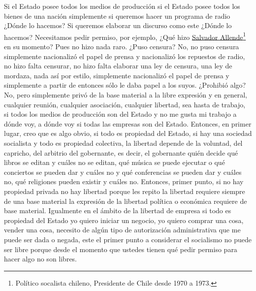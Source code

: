 Si el Estado posee todos los medios de producción si el Estado posee todos los bienes de una nación simplemente si queremos hacer un programa de radio ¿Dónde lo hacemos? Si queremos elaborar un discurso como este ¿Dónde lo hacemos? Necesitamos pedir permiso, por ejemplo, ¿Qué hizo \href{https://en.wikipedia.org/wiki/Salvador_Allende}{Salvador Allende}\footnote{Político socalista chileno, Presidente de Chile desde 1970 a 1973.} en su momento? Pues no hizo nada raro. ¿Puso censura? No, no puso censura simplemente nacionalizó el papel de prensa y nacionalizó los repuestos de radio, no hizo falta censurar, no hizo falta elaborar una ley de censura, una ley de mordaza, nada así por estilo, simplemente nacionalizó el papel de prensa y simplemente a partir de entonces sólo le daba papel a los suyos. ¿Prohibió algo? No, pero simplemente privó de la base material a la libre expresión y en general, cualquier reunión, cualquier asociación, cualquier libertad, sea hasta de trabajo, si todos los medios de producción son del Estado y no me gusta mi trabajo a dónde voy, a dónde voy si todas las empresas son del Estado. Entonces, en primer lugar, creo que es algo obvio, si todo es propiedad del Estado, si hay una sociedad socialista y todo es propiedad colectiva, la libertad depende de la voluntad, del capricho, del arbitrio del gobernante, es decir, el gobernante quién decide qué libros se editan y cuáles no se editan, qué música se puede ejecutar o qué conciertos se pueden dar y cuáles no y qué conferencias se pueden dar y cuáles no, qué religiones pueden existir y cuáles no. Entonces, primer punto, si no hay propiedad privada no hay libertad porque les repito la libertad requiere siempre de una base material la expresión de la libertad política o económica requiere de base material. Igualmente en el ámbito de la libertad de empresa si todo es propiedad del Estado yo quiero iniciar un negocio, yo quiero comprar una cosa, vender una cosa, necesito de algún tipo de autorización administrativa que me puede ser dada o negada, este el primer punto a considerar el socialismo no puede ser libre porque desde el momento que ustedes tienen qué pedir permiso para hacer algo no son libres.

